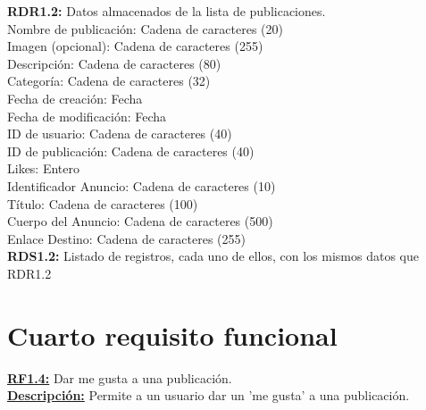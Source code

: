 \textcolor{azul}{\textbf{RDR1.2:}} Datos almacenados de la lista de publicaciones. \\
\hspace*{1cm} Nombre de publicación: Cadena de caracteres (20) \\
\hspace*{1cm} Imagen (opcional): Cadena de caracteres (255) \\
\hspace*{1cm} Descripción: Cadena de caracteres (80) \\ 
\hspace*{1cm} Categoría: Cadena de caracteres (32) \\
\hspace*{1cm} Fecha de creación: Fecha \\
\hspace*{1cm} Fecha de modificación: Fecha \\
\hspace*{1cm} ID de usuario: Cadena de caracteres (40) \\
\hspace*{1cm} ID de publicación: Cadena de caracteres (40) \\
\hspace*{1cm} Likes: Entero \\
\hspace*{1cm} Identificador Anuncio: Cadena de caracteres (10) \\
\hspace*{1cm} Título: Cadena de caracteres (100) \\
\hspace*{1cm} Cuerpo del Anuncio: Cadena de caracteres (500) \\
\hspace*{1cm} Enlace Destino: Cadena de caracteres (255) \\[12pt]

\textcolor{azul}{\textbf{RDS1.2:}} Listado de registros, cada uno de ellos, con los mismos datos que RDR1.2 \\
\pagebreak

\section{Cuarto requisito funcional}
\textbf{\textcolor{rojo}{\underline{RF1.4:}}} Dar me gusta a una publicación. \\[6pt]

\textbf{\textcolor{rojo}{\underline{Descripción:}}} Permite a un usuario dar un 'me gusta' a 
una publicación.\\[6pt]

